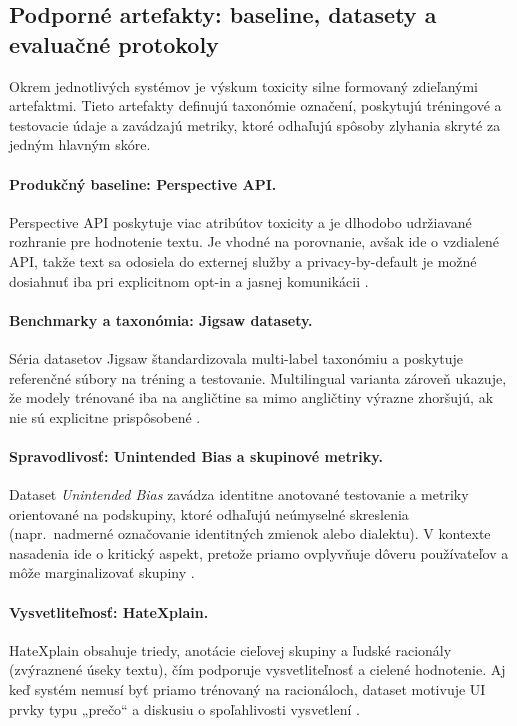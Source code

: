 \subsection{Podporné artefakty: baseline, datasety a evaluačné protokoly}\label{subsec:artefacts_related}
Okrem jednotlivých systémov je výskum toxicity silne formovaný zdieľanými artefaktmi. Tieto artefakty definujú taxonómie označení, poskytujú tréningové a testovacie údaje a zavádzajú metriky, ktoré odhaľujú spôsoby zlyhania skryté za jedným hlavným skóre.

\paragraph{Produkčný baseline: Perspective API.}
Perspective API poskytuje viac atribútov toxicity a je dlhodobo udržiavané rozhranie pre hodnotenie textu. Je vhodné na porovnanie, avšak ide o vzdialené API, takže text sa odosiela do externej služby a privacy-by-default je možné dosiahnuť iba pri explicitnom opt-in a jasnej komunikácii \cite{perspectiveAPI}.

\paragraph{Benchmarky a taxonómia: Jigsaw datasety.}
Séria datasetov Jigsaw štandardizovala multi-label taxonómiu a poskytuje referenčné súbory na tréning a testovanie. Multilingual varianta zároveň ukazuje, že modely trénované iba na angličtine sa mimo angličtiny výrazne zhoršujú, ak nie sú explicitne prispôsobené \cite{jigsaw2018toxic}\cite{jigsaw2020multilingual}.

\paragraph{Spravodlivosť: Unintended Bias a skupinové metriky.}
Dataset \emph{Unintended Bias} zavádza identitne anotované testovanie a metriky orientované na podskupiny, ktoré odhaľujú neúmyselné skreslenia (napr.\ nadmerné označovanie identitných zmienok alebo dialektu). V kontexte nasadenia ide o kritický aspekt, pretože priamo ovplyvňuje dôveru používateľov a môže marginalizovať skupiny \cite{jigsaw2019bias}\cite{borkan2019nuanced}
\cite{dixon2018bias}\cite{sap2019racialbias}.

\paragraph{Vysvetliteľnosť: HateXplain.}
HateXplain obsahuje triedy, anotácie cieľovej skupiny a ľudské racionály (zvýraznené úseky textu), čím podporuje vysvetliteľnosť a cielené hodnotenie. Aj keď systém nemusí byť priamo trénovaný na racionáloch, dataset motivuje UI prvky typu „prečo“ a diskusiu o spoľahlivosti vysvetlení \cite{hatexplain2021}.


